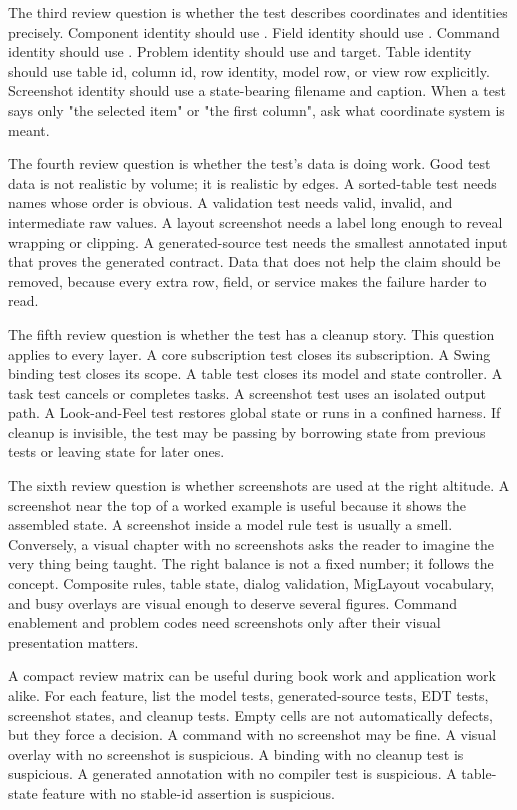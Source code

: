 The third review question is whether the test describes coordinates and identities precisely. Component identity should use . Field identity should use . Command identity should use . Problem identity should use  and target. Table identity should use table id, column id, row identity, model row, or view row explicitly. Screenshot identity should use a state-bearing filename and caption. When a test says only "the selected item" or "the first column", ask what coordinate system is meant.

The fourth review question is whether the test's data is doing work. Good test data is not realistic by volume; it is realistic by edges. A sorted-table test needs names whose order is obvious. A validation test needs valid, invalid, and intermediate raw values. A layout screenshot needs a label long enough to reveal wrapping or clipping. A generated-source test needs the smallest annotated input that proves the generated contract. Data that does not help the claim should be removed, because every extra row, field, or service makes the failure harder to read.

The fifth review question is whether the test has a cleanup story. This question applies to every layer. A core subscription test closes its subscription. A Swing binding test closes its scope. A table test closes its model and state controller. A task test cancels or completes tasks. A screenshot test uses an isolated output path. A Look-and-Feel test restores global state or runs in a confined harness. If cleanup is invisible, the test may be passing by borrowing state from previous tests or leaving state for later ones.

The sixth review question is whether screenshots are used at the right altitude. A screenshot near the top of a worked example is useful because it shows the assembled state. A screenshot inside a model rule test is usually a smell. Conversely, a visual chapter with no screenshots asks the reader to imagine the very thing being taught. The right balance is not a fixed number; it follows the concept. Composite rules, table state, dialog validation, MigLayout vocabulary, and busy overlays are visual enough to deserve several figures. Command enablement and problem codes need screenshots only after their visual presentation matters.

A compact review matrix can be useful during book work and application work alike. For each feature, list the model tests, generated-source tests, EDT tests, screenshot states, and cleanup tests. Empty cells are not automatically defects, but they force a decision. A command with no screenshot may be fine. A visual overlay with no screenshot is suspicious. A binding with no cleanup test is suspicious. A generated annotation with no compiler test is suspicious. A table-state feature with no stable-id assertion is suspicious.

